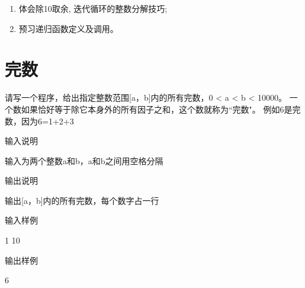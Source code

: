 \begin{note}[知识点]
	\begin{enumerate}
		\item 体会除10取余, 迭代循环的整数分解技巧;
		\item 预习递归函数定义及调用。
	\end{enumerate}
\end{note}

\section{完数}\label{perfect number}
请写一个程序，给出指定整数范围[a，b]内的所有完数，0 < a < b < 10000。
一个数如果恰好等于除它本身外的所有因子之和，这个数就称为``完数"。
例如6是完数，因为6=1+2+3

输入说明	

输入为两个整数a和b，a和b之间用空格分隔

输出说明	

输出[a，b]内的所有完数，每个数字占一行

输入样例	

1 10

输出样例	

6

